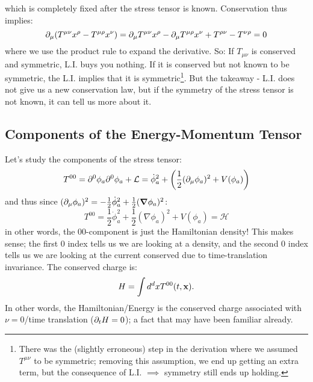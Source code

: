 which is completely fixed after the stress tensor is known. Conservation thus implies:
\begin{equation}
    \partial_\mu(T^{\mu\nu}x^\rho - T^{\mu\rho}x^\nu) = \partial_\mu T^{\mu\nu} x^\rho - \partial_\mu T^{\mu\rho}x^\nu + T^{\rho\nu} - T^{\nu\rho} = 0
\end{equation}
where we use the product rule to expand the derivative. So: If $T_{\mu\nu}$ is conserved and symmetric, L.I. buys you nothing. If it is conserved but not known to be symmetric, the L.I. implies that it is symmetric\footnote{There was the (slightly erroneous) step in the derivation where we assumed $T^{\mu\nu}$ to be symmetric; removing this assumption, we end up getting an extra term, but the consequence of L.I. $\implies$ symmetry still ends up holding.}. But the takeaway - L.I. does not give us a new conservation law, but if the symmetry of the stress tensor is not known, it can tell us more about it.

\subsection{Components of the Energy-Momentum Tensor}
Let's study the components of the stress tensor:
\begin{equation}
    T^{00} = \partial^0\phi_a\partial^0\phi_a + \mathcal{L} = \dot{\phi}_a^2 + \left(\frac{1}{2}(\partial_\mu \phi_a)^2 + V(\phi_a)\right)
\end{equation}
and thus since $(\p_\mu \phi_a)^2 = -\frac{1}{2}\dot{\phi}_a^2 + \frac{1}{2}(\nabla \phi_a)^2$:
\begin{equation}
    T^{00} = \frac{1}{2}\dot{\phi}_a^2 + \frac{1}{2}(\nabla \phi_a)^2 + V(\phi_a) = \mathcal{H}
\end{equation}
in other words, the $00$-component is just the Hamiltonian density! This makes sense; the first $0$ index tells us we are looking at a density, and the second 0 index tells us we are looking at the current conserved due to time-translation invariance. The conserved charge is:
\begin{equation}
    H = \int d^dx T^{00}(t, \mathbf{x}).
\end{equation} 
In other words, the Hamiltonian/Energy is the conserved charge associated with $\nu = 0$/time translation ($\partial_t H = 0$); a fact that may have been familiar already.

